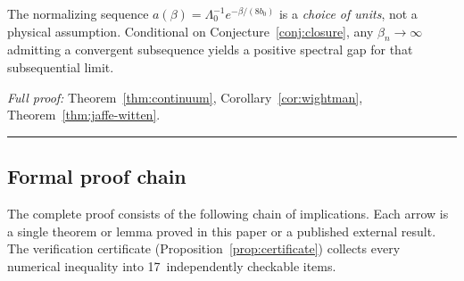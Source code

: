 \documentclass[11pt]{article}
\theoremstyle{definition}
\begin{document}
The normalizing sequence $a(\beta)=\Lambda_0^{-1}
e^{-\beta/(8b_0)}$ is a \emph{choice of units}, not a
physical assumption.  Conditional on Conjecture~\ref{conj:closure}, any $\beta_n\to\infty$ admitting a convergent subsequence yields a positive spectral gap for that subsequential limit.

\emph{Full proof:}
Theorem~\ref{thm:continuum},
Corollary~\ref{cor:wightman},
Theorem~\ref{thm:jaffe-witten}.
\smallskip\hrule\medskip

\subsection{Formal proof chain}\label{subsec:chain}

The complete proof consists of the following chain of
implications.  Each arrow is a single theorem or lemma
proved in this paper or a published external result.
The verification certificate
(Proposition~\ref{prop:certificate}) collects every
numerical inequality into 17~independently checkable items.
\end{document}
